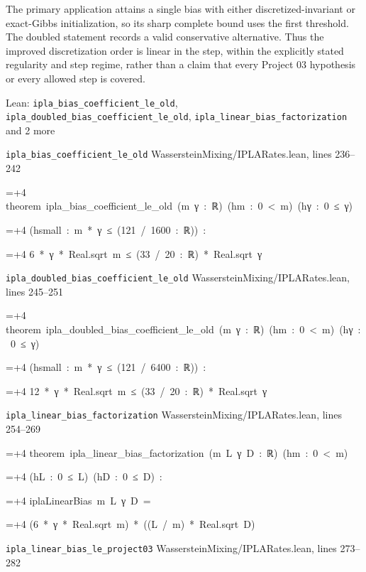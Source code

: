 \documentclass[11pt,a4paper]{report}
\newlength{\leancharwidth}
\newenvironment{leancode}{\par\smallskip\begingroup\ttfamily\footnotesize\raggedright
  \settowidth{\leancharwidth}{M}\setlength{\parskip}{0pt}\setlength{\parindent}{0pt}
  \frenchspacing}{\par\endgroup\smallskip}
\newcommand{\leanline}[2]{\hangindent=\dimexpr#1\leancharwidth+4\leancharwidth\relax
  \hangafter=1\noindent\hspace*{#1\leancharwidth}#2\par}
\newcommand{\leansource}[1]{\par{\footnotesize\color{leanmuted}#1}\par}
\begin{document}
The primary application attains a single bias with either discretized-invariant or exact-Gibbs initialization, so its sharp complete bound uses the first threshold. The doubled statement records a valid conservative alternative. Thus the improved discretization order is linear in the step, within the explicitly stated regularity and step regime, rather than a claim that every Project 03 hypothesis or every allowed step is covered.

\begin{leanbox}{Lean: \texttt{ipla\_\allowbreak{}bias\_\allowbreak{}coefficient\_\allowbreak{}le\_\allowbreak{}old}, \texttt{ipla\_\allowbreak{}doubled\_\allowbreak{}bias\_\allowbreak{}coefficient\_\allowbreak{}le\_\allowbreak{}old}, \texttt{ipla\_\allowbreak{}linear\_\allowbreak{}bias\_\allowbreak{}factorization} and 2 more}
\leansource{\texttt{ipla\_\allowbreak{}bias\_\allowbreak{}coefficient\_\allowbreak{}le\_\allowbreak{}old} \quad WassersteinMixing/\allowbreak{}IPLARates.lean, lines 236–242}
\begin{leancode}
\leanline{0}{theorem\ ipla\_bias\_coefficient\_le\_old\ (m\ γ\ :\ ℝ)\ (hm\ :\ 0\ <\ m)\ (hγ\ :\ 0\ ≤\ γ)}
\leanline{4}{(hsmall\ :\ m\ *\ γ\ ≤\ (121\ /\ 1600\ :\ ℝ))\ :}
\leanline{4}{6\ *\ γ\ *\ Real.sqrt\ m\ ≤\ (33\ /\ 20\ :\ ℝ)\ *\ Real.sqrt\ γ}
\end{leancode}
\leansource{\texttt{ipla\_\allowbreak{}doubled\_\allowbreak{}bias\_\allowbreak{}coefficient\_\allowbreak{}le\_\allowbreak{}old} \quad WassersteinMixing/\allowbreak{}IPLARates.lean, lines 245–251}
\begin{leancode}
\leanline{0}{theorem\ ipla\_doubled\_bias\_coefficient\_le\_old\ (m\ γ\ :\ ℝ)\ (hm\ :\ 0\ <\ m)\ (hγ\ :\ 0\ ≤\ γ)}
\leanline{4}{(hsmall\ :\ m\ *\ γ\ ≤\ (121\ /\ 6400\ :\ ℝ))\ :}
\leanline{4}{12\ *\ γ\ *\ Real.sqrt\ m\ ≤\ (33\ /\ 20\ :\ ℝ)\ *\ Real.sqrt\ γ}
\end{leancode}
\leansource{\texttt{ipla\_\allowbreak{}linear\_\allowbreak{}bias\_\allowbreak{}factorization} \quad WassersteinMixing/\allowbreak{}IPLARates.lean, lines 254–269}
\begin{leancode}
\leanline{0}{theorem\ ipla\_linear\_bias\_factorization\ (m\ L\ γ\ D\ :\ ℝ)\ (hm\ :\ 0\ <\ m)}
\leanline{4}{(hL\ :\ 0\ ≤\ L)\ (hD\ :\ 0\ ≤\ D)\ :}
\leanline{4}{iplaLinearBias\ m\ L\ γ\ D\ =}
\leanline{6}{(6\ *\ γ\ *\ Real.sqrt\ m)\ *\ ((L\ /\ m)\ *\ Real.sqrt\ D)}
\end{leancode}
\leansource{\texttt{ipla\_\allowbreak{}linear\_\allowbreak{}bias\_\allowbreak{}le\_\allowbreak{}project03} \quad WassersteinMixing/\allowbreak{}IPLARates.lean, lines 273–282}

\end{leanbox}
\end{document}

